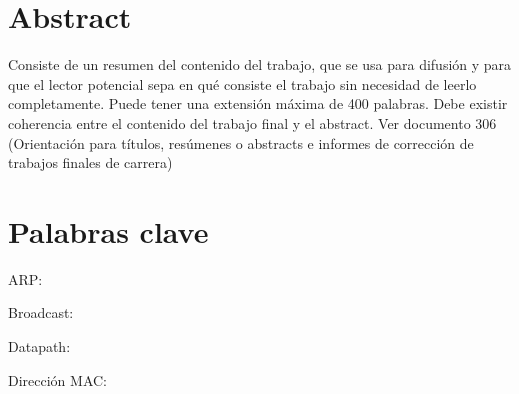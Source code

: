 \documentclass[12pt,a4paper,oneside]{book}
\begin{document}
\chapter*{Abstract}

Consiste de un resumen del contenido del trabajo, que se usa para difusión y para que el lector potencial sepa en qué consiste el trabajo sin necesidad de leerlo completamente. Puede tener una extensión máxima de 400 palabras. Debe existir coherencia entre el contenido del trabajo final y el abstract. Ver documento 306 (Orientación para títulos, resúmenes o abstracts e informes de corrección de trabajos finales de carrera)



\chapter*{Palabras clave}



ARP: 

Broadcast: 


Datapath: 

Dirección MAC: 
\end{document}
